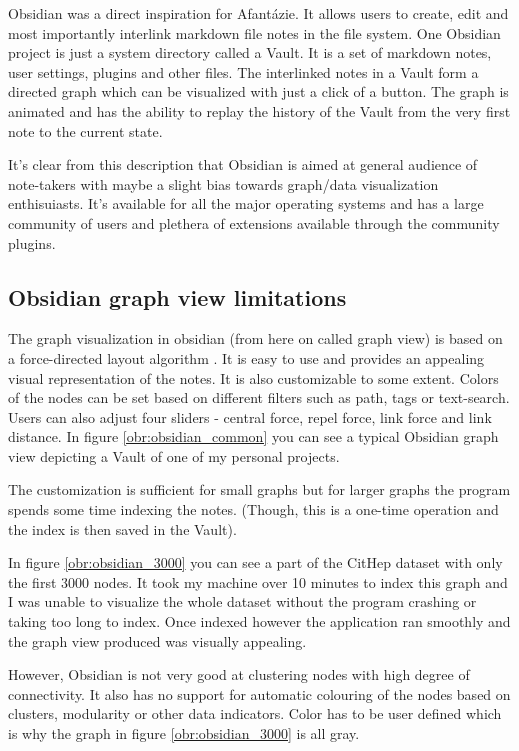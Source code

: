 Obsidian was a direct inspiration for Afantázie. It allows users to create, edit and most importantly interlink markdown file notes in the file system.
One Obsidian project is just a system directory called a Vault. It is a set of markdown notes, user settings, plugins and other files.
The interlinked notes in a Vault form a directed graph which can be visualized with just a click of a button.
The graph is animated and has the ability to replay the history of the Vault from the very first note to the current state.

It's clear from this description that Obsidian is aimed at general audience of note-takers 
with maybe a slight bias towards graph/data visualization enthisuiasts.
It's available for all the major operating systems and has a large community of users and plethera of extensions available through the community plugins.

\subsection{Obsidian graph view limitations}

The graph visualization in obsidian (from here on called graph view) is based on a force-directed layout algorithm .
It is easy to use and provides an appealing visual representation of the notes. It is also customizable to some extent.
Colors of the nodes can be set based on different filters such as path, tags or text-search.
Users can also adjust four sliders - central force, repel force, link force and link distance.
In figure \ref{obr:obsidian_common} you can see a typical Obsidian graph view depicting a Vault of one of my personal projects.

The customization is sufficient for small graphs but for larger graphs the program spends some time indexing the notes.
(Though, this is a one-time operation and the index is then saved in the Vault).

In figure \ref{obr:obsidian_3000} you can see a part of the CitHep dataset with only the first 3000 nodes.
It took my machine over 10 minutes to index this graph and I was unable to visualize the whole dataset without the program crashing or taking too long to index.
Once indexed however the application ran smoothly and the graph view produced was visually appealing.

However, Obsidian is not very good at clustering nodes with high degree of connectivity.
It also has no support for automatic colouring of the nodes based on clusters, modularity  or other data indicators.
Color has to be user defined which is why the graph in figure \ref{obr:obsidian_3000} is all gray.


